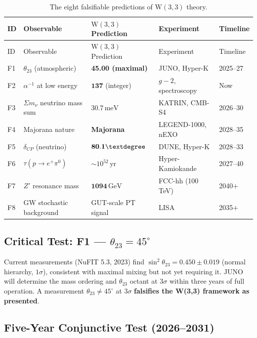 \documentclass[12pt,a4paper]{article}
\newcommand{\W}{\mathrm{W}(3,3)}
\newcommand{\sumnu}{\Sigma m_\nu}
\newcommand{\thetaTT}{\theta_{23}}
\newcommand{\deltaCP}{\delta_{\!CP}}
\begin{document}
\begin{longtable}{@{}p{0.5cm}p{3.4cm}p{3.4cm}p{3cm}p{1.6cm}@{}}
\caption{The eight falsifiable predictions of $\W$ theory.}
\label{tab:predictions}\\
\toprule
ID & Observable & $\W$ Prediction & Experiment & Timeline \\
\midrule
\endfirsthead
\toprule
ID & Observable & $\W$ Prediction & Experiment & Timeline \\
\midrule
\endhead
\bottomrule
\endfoot
F1 & $\thetaTT$ (atmospheric) &
  \textbf{45.00\textdegree{} (maximal)} &
  JUNO, Hyper-K & 2025--27 \\
F2 & $\alpha^{-1}$ at low energy &
  $\mathbf{137}$ (integer) &
  $g{-}2$, spectroscopy & Now \\
F3 & $\sumnu$ neutrino mass sum &
  $\mathbf{30.7\,\mathrm{meV}}$ &
  KATRIN, CMB-S4 & 2026--30 \\
F4 & Majorana nature &
  \textbf{Majorana} &
  LEGEND-1000, nEXO & 2028--35 \\
F5 & $\deltaCP$ (neutrino) &
  $\mathbf{80.1\textdegree}$ &
  DUNE, Hyper-K & 2028--33 \\
F6 & $\tau(p\to e^+\pi^0)$ &
  $\sim 10^{52}\,\mathrm{yr}$ &
  Hyper-Kamiokande & 2027--40 \\
F7 & $Z'$ resonance mass &
  $\mathbf{1094\,\mathrm{GeV}}$ &
  FCC-hh (100 TeV) & 2040$+$ \\
F8 & GW stochastic background &
  GUT-scale PT signal &
  LISA & 2035$+$ \\
\end{longtable}

\subsection{Critical Test: F1 --- $\thetaTT = 45^\circ$}

Current measurements (NuFIT 5.3, 2023) find
$\sin^2\thetaTT = 0.450\pm 0.019$ (normal hierarchy, $1\sigma$),
consistent with maximal mixing but not yet requiring it.
JUNO \cite{JUNO2022} will determine the mass ordering and $\thetaTT$
octant at $3\sigma$ within three years of full operation.
A measurement $\thetaTT\neq 45^\circ$ at $3\sigma$
\textbf{falsifies the W(3,3) framework as presented}.

\subsection{Five-Year Conjunctive Test (2026--2031)}
\end{document}

